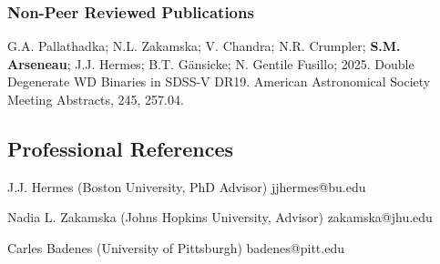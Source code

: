 \documentclass[12pt,letterpaper]{article}
\begin{document}
\subsubsection{Non-Peer Reviewed Publications}
\begin{list}{}{\cvlist}
  \item[\color{numcolor}\scriptsize1] G.A. Pallathadka; N.L. Zakamska; V. Chandra; N.R. Crumpler; \textbf{S.M. Arseneau}; J.J. Hermes; B.T. G\"ansicke; N. Gentile Fusillo; 2025. Double Degenerate WD Binaries in SDSS-V DR19. American Astronomical Society Meeting Abstracts, 245, 257.04.

\end{list}

\subsection{Professional References}
\begin{list}{}{\cvlist}
  \item J.J. Hermes (Boston University, PhD Advisor) \hfill jjhermes@bu.edu
  \item Nadia L. Zakamska (Johns Hopkins University, Advisor) \hfill zakamska@jhu.edu
  \item Carles Badenes (University of Pittsburgh) \hfill badenes@pitt.edu
\end{list}
\end{document}

